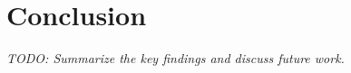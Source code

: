 \section{Conclusion}
\label{sec:conclusion}
\textit{TODO: Summarize the key findings and discuss future work.}
